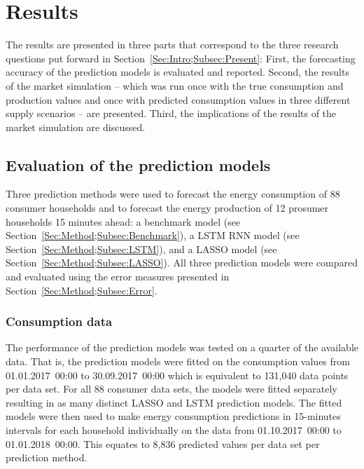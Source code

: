 
\section{Results}\label{Sec:Results}

The results are presented in three parts that correspond to the three research questions put forward in Section~\ref{Sec:Intro;Subsec:Present}: First, the forecasting accuracy of the prediction models is evaluated and reported. Second, the results of the market simulation -- which was run once with the true consumption and production values and once with predicted consumption values in three different supply scenarios -- are presented. Third, the implications of the results of the market simulation are discussed.



\subsection{Evaluation of the prediction models}\label{Sec:Results;Subsec:Forecast}

Three prediction methods were used to forecast the energy consumption of 88 consumer households and to forecast the energy production of 12 prosumer households 15 minutes ahead: a benchmark model (see Section~\ref{Sec:Method;Subsec:Benchmark}), a LSTM RNN model (see Section~\ref{Sec:Method;Subsec:LSTM}), and a LASSO model (see Section~\ref{Sec:Method;Subsec:LASSO}). All three prediction models were compared and evaluated using the error measures presented in Section~\ref{Sec:Method;Subsec:Error}.


\subsubsection{Consumption data}

The performance of the prediction models was tested on a quarter of the available data. That is, the prediction models were fitted on the consumption values from 01.01.2017~00:00 to 30.09.2017~00:00 which is equivalent to 131,040 data points per data set. For all 88 consumer data sets, the models were fitted separately resulting in as many distinct LASSO and LSTM prediction models. The fitted models were then used to make energy consumption predictions in 15-minutes intervals for each household individually on the data from 01.10.2017~00:00 to 01.01.2018~00:00. This equates to 8,836 predicted values per data set per prediction method.

